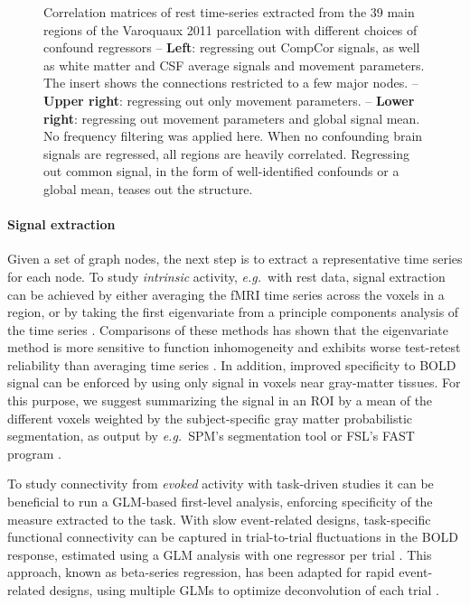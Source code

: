 \documentclass[5p]{elsarticle}
\begin{document}
\begin{figure}

\caption{
Correlation matrices of rest time-series extracted from the 39 main
regions of the Varoquaux 2011 \cite{varoquaux2011} parcellation with
different choices of confound regressors -- 
\textbf{Left}: regressing out CompCor signals, as well as white matter and
CSF average signals and movement parameters. The insert shows the
connections restricted to a few major nodes.
-- \textbf{Upper right}: regressing out only movement parameters. -- 
\textbf{Lower right}:
regressing out movement parameters and global signal mean.
No frequency filtering was applied here.
\label{fig:correlation_matrices}
When no confounding brain signals are regressed, all regions are heavily
correlated. Regressing out common signal, in the form of well-identified
confounds or a global mean, teases out the structure.
}
\end{figure}

\paragraph{Signal extraction}
%
Given a set of graph nodes, the next step is to extract a representative time
series for each node.  To study \emph{intrinsic} activity, \emph{e.g.}\ with
rest data, signal extraction can be achieved by either averaging the fMRI time
series across the voxels in a region, or by taking the first eigenvariate from a
principle components analysis of the time series \cite{friston2006}.
Comparisons of these methods has shown that the eigenvariate method is
more sensitive to function inhomogeneity \cite{craddock2012} and exhibits worse
test-retest reliability than averaging time series \cite{zuo2010}. 
In addition, improved specificity to BOLD signal can be enforced
by using only signal in voxels near gray-matter tissues. For this purpose, we
suggest summarizing the signal in an ROI by a mean of the different voxels
weighted by the subject-specific gray matter probabilistic segmentation, 
as output by \emph{e.g.}\ SPM's segmentation tool \cite{ashburner2005} or
FSL's FAST program \cite{zhang2001}.

To study connectivity from \emph{evoked} activity with task-driven studies it
can be beneficial to run a GLM-based first-level analysis, enforcing specificity
of the measure extracted to the task. With slow event-related designs,
task-specific functional connectivity can be captured in trial-to-trial
fluctuations in the BOLD response, estimated using a GLM analysis with one
regressor per trial \cite{grillon2012,rissman2004,mennes2010}. This approach,
known as beta-series regression, has been adapted for rapid event-related
designs, using multiple GLMs to optimize deconvolution of each trial
\cite{mumford2012}.
\end{document}
